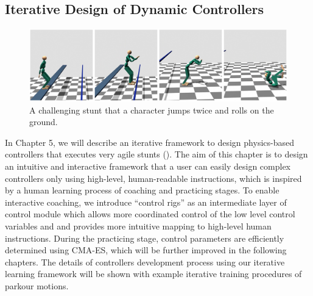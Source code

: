 \subsection{Iterative Design of Dynamic Controllers}
\begin{figure}[h]
  \begin{center}
    \includegraphics[width=1.0\textwidth]{images/intro_drop_roll}
  \end{center}
  \caption{A challenging stunt that a character jumps twice and rolls
    on the ground.}
  \label{fig:intro_drop_roll}
\end{figure}

In Chapter 5, we will describe an iterative framework to design physics-based
controllers that executes very agile stunts ().
The aim of this chapter is to design an intuitive and interactive framework
that a user can easily design complex controllers only using high-level,
human-readable instructions, 
which is inspired by a human learning process of coaching and practicing stages.
To enable interactive coaching, we introduce ``control rigs'' as
an intermediate layer of control module which allows more coordinated control
of the low level control variables and and provides more intuitive mapping to
high-level human instructions. 
During the practicing stage, control parameters are efficiently determined
using CMA-ES, which will be further improved in the following chapters.
The details of controllers development process using our iterative learning
framework will be shown with example iterative training procedures of parkour
motions.

